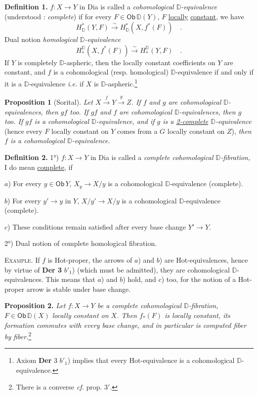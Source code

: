 \documentclass[11pt]{article}
\newcommand{\printedpage}[1]{\marginpar{\footnotesize p.~#1}}
\newcommand{\msp}[1]{\marginpar{\footnotesize [#1]}}
\newcommand{\Hot}{\textsf{Hot}}
\newcommand{\Dia}{\textsf{Dia}}
\newcommand{\Ob}{\textsf{Ob}}
\newcommand{\DD}{\mathbb{D}}
\begin{document}
\msp{page 101}
\textbf{Definition 1.} $f : X \to Y$ in \Dia{} is called a \textit{cohomological $\DD$-equivalence} (understood : \textit{complete}) if for every $F \in \Ob\,\DD(Y)$, $F$ \underline{locally} \underline{constant}, we have
\[
H^*_{\DD}(Y,F) \overset{\sim}{\longrightarrow} H^*_{\DD}(X, f^*(F)) \quad .
\]
Dual notion \textit{homological $\DD$-equivalence}
\[
H_*^{\DD}(X, f^*(F)) \overset{\sim}{\longrightarrow} H_*^{\DD}(Y,F) \quad .
\]
If $Y$ is completely $\DD$-aspheric, then the locally constant coefficients on $Y$ are constant, and $f$ is a cohomological (resp. homological) $\DD$-equivalence if and only if it is a $\DD$-equivalence \textit{i.e.} if $X$ is $\DD$-aspheric.\footnote[53]{Axiom \textbf{Der} 3 $b'_1$) implies that every \Hot-equivalence is a cohomological $\DD$-equivalence.}

\textbf{Proposition 1} (Sorital). \textit{Let $X \overset{f}{\to} Y \overset{g}{\to} Z$. If $f$ and $g$ are cohomological $\DD$-equivalences, then $gf$ too. If $gf$ and $f$ are cohomological $\DD$-equivalences, then $g$ too. If $gf$ is a cohomological $\DD$-equivalence, and if $g$ is a \underline{2-complete} $\DD$-equivalence} (hence every $F$ locally constant on $Y$ comes from a $G$ locally constant on $Z$), \textit{then $f$ is a cohomological $\DD$-equivalence.}

\textbf{Definition 2.} 1°) $f : X \to Y$ in \Dia{} is called a \textit{complete cohomological $\DD$-fibration,} I do mean \underline{complete}, if

$a$) For every $y \in \Ob\, Y$, $X_y \to X/y$ is a cohomological $\DD$-equivalence (complete).

$b$) For every $y' \to y$ in $Y$, $X/y' \to X/y$ is a cohomological $\DD$-equivalence (complete).

\printedpage{62}

\msp{page 102}
$c$) These conditions remain satisfied after every base change $Y' \to Y$.

2°) Dual notion of complete homological fibration.

\textsc{Example.} If $f$ is \Hot-proper, the arrows of $a$) and $b$) are \Hot-equivalences, hence by virtue of \textbf{Der 3} $b'_1$) (which must be admitted), they are cohomological $\DD$-equivalences. This means that $a$) and $b$) hold, and $c$) too, for the notion of a \Hot-proper arrow is stable under base change.

\textbf{Proposition 2.} \textit{Let $f : X \to Y$ be a complete cohomological $\DD$-fibration, $F \in \Ob\,\DD(X)$ locally constant on $X$. Then $f_*(F)$ is locally constant, its formation commutes with every base change, and in particular is computed fiber by fiber.}\footnote[54]{There is a converse \textit{cf.} prop. 3$'$.}
\end{document}
